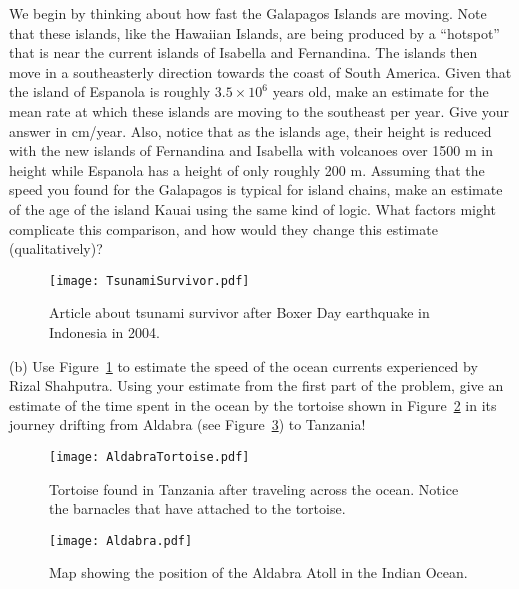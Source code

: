 \documentclass[12pt]{article}    %
\begin{document}
\noindent We begin by thinking about how fast the Galapagos Islands are moving.  Note that these islands, like the Hawaiian Islands, are being produced by a ``hotspot'' that is near the current islands of Isabella and Fernandina.  The islands then move in a southeasterly direction towards the coast of South America.  Given that the island of Espanola is roughly 
$3.5 \times 10^6$ years old, make an estimate for the mean rate at which these islands are moving to the southeast per year.  Give your answer in cm/year.
Also, notice that as the islands age, their height is reduced with the new islands of 
Fernandina and Isabella with volcanoes over 1500 m in height while Espanola has a
height of only roughly 200 m.   Assuming that the speed you found for the Galapagos
is typical for island chains, make an estimate of the age of the island Kauai using
the same kind of logic.  What factors might complicate this comparison, and how would they change this estimate (qualitatively)?\\


\begin{figure}[h]
\begin{center}
\texttt{[image: TsunamiSurvivor.pdf]}
\caption{Article about tsunami survivor after Boxer Day
earthquake in Indonesia in 2004.}
\label{fig:Tsunami}
\end{center}
\end{figure}


(b) Use Figure~\ref{fig:Tsunami} to estimate the
speed of the ocean currents experienced by Rizal Shahputra.
Using your estimate from the first part of the problem,
give an estimate of the time spent in the ocean by the 
tortoise shown in Figure~\ref{fig:Tortoise} in its journey
drifting from Aldabra (see Figure~\ref{fig:Aldabra}) to Tanzania!\\

\begin{figure}[h]
\begin{center}
\texttt{[image: AldabraTortoise.pdf]}
\caption{Tortoise found in Tanzania after traveling across
the ocean.  Notice the barnacles that have attached to the tortoise.
}
\label{fig:Tortoise}
\end{center}
\end{figure}

\begin{figure}[h]
\begin{center}
\texttt{[image: Aldabra.pdf]}
\caption{Map showing the position of the Aldabra Atoll in
the Indian Ocean.
}
\label{fig:Aldabra}
\end{center}
\end{figure}
\end{document}
